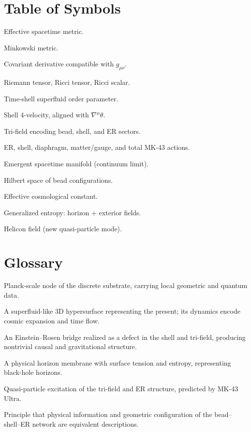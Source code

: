 \chapter*{Table of Symbols}

\begin{description}[leftmargin=2.5cm,style=nextline]
    \item[$g_{\mu\nu}$] Effective spacetime metric.
    \item[$\eta_{\mu\nu}$] Minkowski metric.
    \item[$\nabla_\mu$] Covariant derivative compatible with $g_{\mu\nu}$.
    \item[$R_{\mu\nu\rho\sigma}, R_{\mu\nu}, R$] Riemann tensor, Ricci tensor, Ricci scalar.
    \item[$\Phi = |\Phi| e^{i\theta}$] Time-shell superfluid order parameter.
    \item[$u^\mu$] Shell 4-velocity, aligned with $\nabla^\mu \theta$.
    \item[$\Ttri$] Tri-field encoding bead, shell, and ER sectors.
    \item[$\SER, \Sshell, \Sdiag, \Sfields, \SMK$] ER, shell, diaphragm, matter/gauge, and total MK-43 actions.
    \item[$\M$] Emergent spacetime manifold (continuum limit).
    \item[$\Hbead$] Hilbert space of bead configurations.
    \item[$\Lambdaeff$] Effective cosmological constant.
    \item[$\Sgen$] Generalized entropy: horizon + exterior fields.
    \item[$\Bhel$] Helicon field (new quasi-particle mode).
\end{description}

\chapter*{Glossary}

\begin{description}[style=nextline]
    \item[Bead] Planck-scale node of the discrete substrate, carrying local geometric and quantum data.
    \item[Time Shell] A superfluid-like 3D hypersurface representing the present; its dynamics encode cosmic expansion and time flow.
    \item[ER Bridge] An Einstein--Rosen bridge realized as a defect in the shell and tri-field, producing nontrivial causal and gravitational structure.
    \item[Diaphragm] A physical horizon membrane with surface tension and entropy, representing black-hole horizons.
    \item[Helicon] Quasi-particle excitation of the tri-field and ER structure, predicted by MK-43 Ultra.
    \item[Information = Geometry] Principle that physical information and geometric configuration of the bead--shell--ER network are equivalent descriptions.
\end{description}

